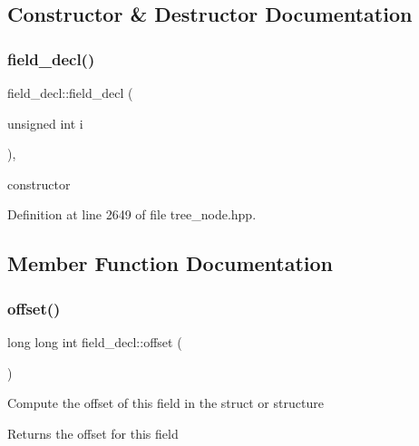 \subsection{Constructor \& Destructor Documentation}
\mbox{\label{structfield__decl_a0b28ff75222792953eb861dc00e45771}} 
\subsubsection{\texorpdfstring{field\+\_\+decl()}{field\_decl()}}
{\footnotesize\ttfamily field\+\_\+decl\+::field\+\_\+decl (\begin{DoxyParamCaption}\item[{unsigned int}]{i }\end{DoxyParamCaption})\hspace{0.3cm}{\ttfamily [inline]}, {\ttfamily [explicit]}}



constructor 



Definition at line 2649 of file tree\+\_\+node.\+hpp.



\subsection{Member Function Documentation}
\mbox{\label{structfield__decl_a7ed575f4c4833c1be181bd962e1c1966}} 
\subsubsection{\texorpdfstring{offset()}{offset()}}
{\footnotesize\ttfamily long long int field\+\_\+decl\+::offset (\begin{DoxyParamCaption}{ }\end{DoxyParamCaption})}


\begin{DoxyItemize}
\item Compute the offset of this field in the struct or structure \begin{DoxyReturn}{Returns}
the offset for this field 
\end{DoxyReturn}

\end{DoxyItemize}

